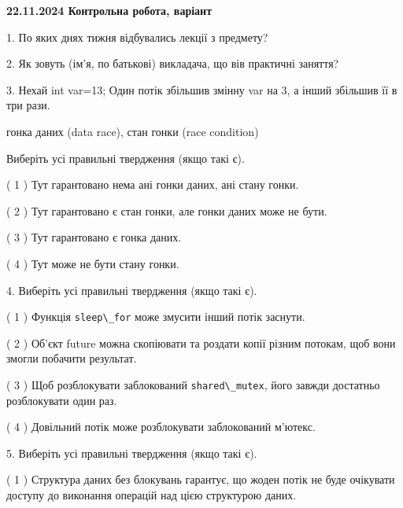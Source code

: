 \documentclass[12pt, ukrainian]{article}
\def\code#1{\Verb!#1!}
\begin{document}
\vspace{4mm}
\newpage
\begin {large}

\textbf{22.11.2024 Контрольна робота, варіант  }\par


{
1. По яких днях тижня відбувались лекції з предмету?



\vspace{5mm}
2. Як зовуть (ім'я, по батькові) викладача, що вів практичні заняття?



\vspace{5mm}
3. Нехай int var=13; Один потік збільшив змінну var на 3, а інший збільшив її в три рази.

гонка даних (data race), стан гонки (race condition)

Виберіть усі правильні твердження (якщо такі є).\par
\vspace{2mm}
( 1 ) Тут гарантовано нема ані гонки даних, ані стану гонки.%

( 2 ) Тут гарантовано є стан гонки, але гонки даних може не бути.%

( 3 ) Тут гарантовано є гонка даних.%

( 4 ) Тут може не бути стану гонки.%


\vspace{5mm}
4. Виберіть усі правильні твердження (якщо такі є).\par
\vspace{2mm}

( 1 ) Функція \code{sleep\_for} може змусити інший потік заснути.%

( 2 ) Об’єкт future можна скопіювати та роздати копії різним потокам, щоб вони змогли побачити результат.%

( 3 ) Щоб розблокувати заблокований \code{shared\_mutex}, його завжди достатньо розблокувати один раз.%

( 4 ) Довільний потік може розблокувати заблокований м’ютекс.%


\vspace{5mm}
5. Виберіть усі правильні твердження (якщо такі є).\par
\vspace{2mm}

( 1 ) Структура даних без блокувань гарантує, що жоден потік не буде очікувати доступу до виконання операцій над цією структурою даних.%

}
\end{large}
\end{document}
